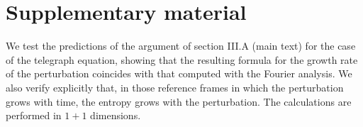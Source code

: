 \documentclass[a4paper, amsfonts, amssymb, amsmath, reprint, showkeys,  twoside, onecolumn,notitlepage,nofootinbib]{revtex4-1}
\theoremstyle{definition}
\theoremstyle{theorem}
\begin{document}
%
%
%





\newpage 


\section*{Supplementary material}






We test the predictions of the argument of section III.A (main text) for the case of the telegraph equation, showing that the resulting formula for the growth rate of the perturbation coincides with that computed with the Fourier analysis. We also verify explicitly that, in those reference frames in which the perturbation grows with time, the entropy grows with the perturbation. The calculations are performed in $1{+}1$ dimensions. 




\maketitle
\end{document}
